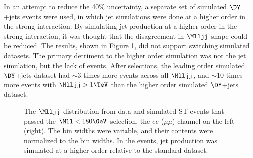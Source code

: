 In an attempt to reduce the 40\% uncertainty, a separate set of simulated $\DY$+jets events were used, in which jet simulations 
were done at a higher order in the strong interaction.  By simulating jet production at a higher order in the strong 
interaction, it was thought that the disagreement in $\Mlljj$ shape could be reduced.  The results, shown in Figure 
\ref{fig:mlljjLowDileptonMassSidebandAMCNLO}, did not support switching simulated \DY datasets.  The primary detriment to the 
higher order \DY simulation was not the jet simulation, but the lack of events.  After selections, the leading order 
simulated $\DY$+jets dataset had $\sim$3 times more events across all $\Mlljj$, and $\sim$10 times more events with $\Mlljj > 1 \TeV$ 
than the higher order simulated $\DY$+jets dataset.

\begin{figure}[btp]
\centering
{}
\caption{The $\Mlljj$ distribution from data and simulated ST events that passed the $\Mll < 180 \GeV$ selection, the 
		$ee$ ($\mu\mu$) channel on the left (right).  The bin widths were variable, and their contents were normalized to 
	the bin widths.  In the \DY events, jet production was simulated at a higher order relative to the standard \DY dataset.}
\label{fig:mlljjLowDileptonMassSidebandAMCNLO}
\end{figure}


